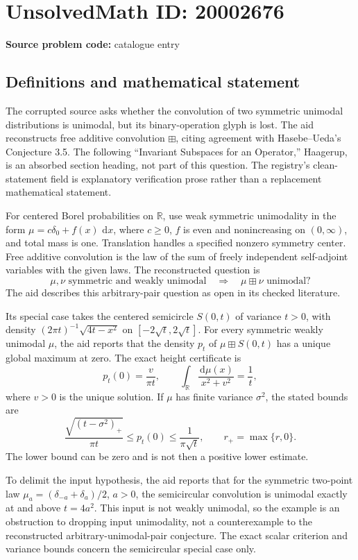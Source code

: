 \documentclass[11pt]{article}
\newcommand{\R}{\mathbb{R}}
\newcommand{\dd}{\,\mathrm{d}}
\begin{document}
\section*{UnsolvedMath ID: 20002676}
\textbf{Source problem code:} catalogue entry
\subsection{Definitions and mathematical statement}
The corrupted source asks whether the convolution of two symmetric unimodal distributions is unimodal, but its binary-operation glyph is lost. The aid reconstructs free additive convolution $\boxplus$, citing agreement with Hasebe--Ueda's Conjecture 3.5. The following ``Invariant Subspaces for an Operator,'' Haagerup, is an absorbed section heading, not part of this question. The registry's clean-statement field is explanatory verification prose rather than a replacement mathematical statement.

For centered Borel probabilities on $\R$, use weak symmetric unimodality in the form $\mu=c\delta_0+f(x)\,\dd x$, where $c\ge0$, $f$ is even and nonincreasing on $(0,\infty)$, and total mass is one. Translation handles a specified nonzero symmetry center. Free additive convolution is the law of the sum of freely independent self-adjoint variables with the given laws. The reconstructed question is
\[
 \mu,\nu\text{ symmetric and weakly unimodal}
 \quad\Longrightarrow\quad \mu\boxplus\nu\text{ unimodal}?
\]
The aid describes this arbitrary-pair question as open in its checked literature.

Its special case takes the centered semicircle $S(0,t)$ of variance $t>0$, with density $(2\pi t)^{-1}\sqrt{4t-x^2}$ on $[-2\sqrt t,2\sqrt t]$. For every symmetric weakly unimodal $\mu$, the aid reports that the density $p_t$ of $\mu\boxplus S(0,t)$ has a unique global maximum at zero. The exact height certificate is
\[
 p_t(0)=\frac{v}{\pi t},\qquad
 \int_\R\frac{\dd\mu(x)}{x^2+v^2}=\frac1t,
\]
where $v>0$ is the unique solution. If $\mu$ has finite variance $\sigma^2$, the stated bounds are
\[
 \frac{\sqrt{(t-\sigma^2)_+}}{\pi t}
 \le p_t(0)\le\frac1{\pi\sqrt t},\qquad r_+=\max\{r,0\}.
\]
The lower bound can be zero and is not then a positive lower estimate.

To delimit the input hypothesis, the aid reports that for the symmetric two-point law $\mu_a=(\delta_{-a}+\delta_a)/2$, $a>0$, the semicircular convolution is unimodal exactly at and above $t=4a^2$. This input is not weakly unimodal, so the example is an obstruction to dropping input unimodality, not a counterexample to the reconstructed arbitrary-unimodal-pair conjecture. The exact scalar criterion and variance bounds concern the semicircular special case only.
\end{document}
